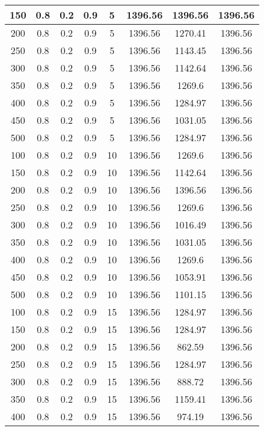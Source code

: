 \documentclass[a4paper, 12pt]{extreport}
\begin{document}
\begin{itemize}
\begin{longtable}{|c|c|c|c|c|c|c|c|}
			150 & 0.8 & 0.2 & 0.9 & 5 & 1396.56 & 1396.56 & 1396.56 \\\hline
			200 & 0.8 & 0.2 & 0.9 & 5 & 1396.56 & 1270.41 & 1396.56 \\\hline
			250 & 0.8 & 0.2 & 0.9 & 5 & 1396.56 & 1143.45 & 1396.56 \\\hline
			300 & 0.8 & 0.2 & 0.9 & 5 & 1396.56 & 1142.64 & 1396.56 \\\hline
			350 & 0.8 & 0.2 & 0.9 & 5 & 1396.56 & 1269.6 & 1396.56 \\\hline
			400 & 0.8 & 0.2 & 0.9 & 5 & 1396.56 & 1284.97 & 1396.56 \\\hline
			450 & 0.8 & 0.2 & 0.9 & 5 & 1396.56 & 1031.05 & 1396.56 \\\hline
			500 & 0.8 & 0.2 & 0.9 & 5 & 1396.56 & 1284.97 & 1396.56 \\\hline
			100 & 0.8 & 0.2 & 0.9 & 10 & 1396.56 & 1269.6 & 1396.56 \\\hline
			150 & 0.8 & 0.2 & 0.9 & 10 & 1396.56 & 1142.64 & 1396.56 \\\hline
			200 & 0.8 & 0.2 & 0.9 & 10 & 1396.56 & 1396.56 & 1396.56 \\\hline
			250 & 0.8 & 0.2 & 0.9 & 10 & 1396.56 & 1269.6 & 1396.56 \\\hline
			300 & 0.8 & 0.2 & 0.9 & 10 & 1396.56 & 1016.49 & 1396.56 \\\hline
			350 & 0.8 & 0.2 & 0.9 & 10 & 1396.56 & 1031.05 & 1396.56 \\\hline
			400 & 0.8 & 0.2 & 0.9 & 10 & 1396.56 & 1269.6 & 1396.56 \\\hline
			450 & 0.8 & 0.2 & 0.9 & 10 & 1396.56 & 1053.91 & 1396.56 \\\hline
			500 & 0.8 & 0.2 & 0.9 & 10 & 1396.56 & 1101.15 & 1396.56 \\\hline
			100 & 0.8 & 0.2 & 0.9 & 15 & 1396.56 & 1284.97 & 1396.56 \\\hline
			150 & 0.8 & 0.2 & 0.9 & 15 & 1396.56 & 1284.97 & 1396.56 \\\hline
			200 & 0.8 & 0.2 & 0.9 & 15 & 1396.56 & 862.59 & 1396.56 \\\hline
			250 & 0.8 & 0.2 & 0.9 & 15 & 1396.56 & 1284.97 & 1396.56 \\\hline
			300 & 0.8 & 0.2 & 0.9 & 15 & 1396.56 & 888.72 & 1396.56 \\\hline
			350 & 0.8 & 0.2 & 0.9 & 15 & 1396.56 & 1159.41 & 1396.56 \\\hline
			400 & 0.8 & 0.2 & 0.9 & 15 & 1396.56 & 974.19 & 1396.56 \\\hline

\end{longtable}
\end{itemize}
\end{document}
